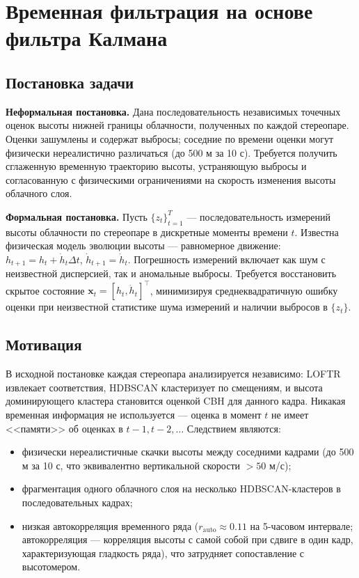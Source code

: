 \documentclass[11pt]{article} %
\begin{document}
	\pagebreak
	
	\section{Временная фильтрация на основе фильтра Калмана}
	\vspace{3mm}\hspace{5mm}
	
\subsection{Постановка задачи}
\vspace{3mm}\hspace{5mm}

\textbf{Неформальная постановка.} Дана последовательность независимых точечных оценок высоты нижней границы облачности, полученных по каждой стереопаре. Оценки зашумлены и содержат выбросы; соседние по времени оценки могут физически нереалистично различаться (до 500 м за 10 с). Требуется получить сглаженную временную траекторию высоты, устраняющую выбросы и согласованную с физическими ограничениями на скорость изменения высоты облачного слоя.

\textbf{Формальная постановка.} Пусть $\{z_t\}_{t=1}^T$ — последовательность измерений высоты облачности по стереопаре в дискретные моменты времени $t$. Известна физическая модель эволюции высоты — равномерное движение: $h_{t+1} = h_t + \dot{h}_t \Delta t$, $\dot{h}_{t+1} = \dot{h}_t$. Погрешность измерений включает как шум с неизвестной дисперсией, так и аномальные выбросы. Требуется восстановить скрытое состояние $\mathbf{x}_t = [h_t, \dot{h}_t]^\top$, минимизируя среднеквадратичную ошибку оценки при неизвестной статистике шума измерений и наличии выбросов в $\{z_t\}$.


\subsection{Мотивация}

В исходной постановке каждая стереопара анализируется независимо: LOFTR извлекает соответствия, HDBSCAN кластеризует по смещениям, и высота доминирующего кластера становится оценкой CBH для данного кадра. Никакая временная информация не используется — оценка в момент $t$ не имеет <<памяти>> об оценках в $t-1, t-2, \dots$ Следствием являются:
	\begin{itemize}
		\item физически нереалистичные скачки высоты между соседними кадрами (до 500 м за 10 с, что эквивалентно вертикальной скорости $>50$ м/с);
		\item фрагментация одного облачного слоя на несколько HDBSCAN-кластеров в последовательных кадрах;
		\item низкая автокорреляция временного ряда ($r_\text{auto} \approx 0.11$ на 5-часовом интервале; автокорреляция — корреляция высоты с самой собой при сдвиге в один кадр, характеризующая гладкость ряда), что затрудняет сопоставление с высотомером.
	\end{itemize}
	
\end{document}
